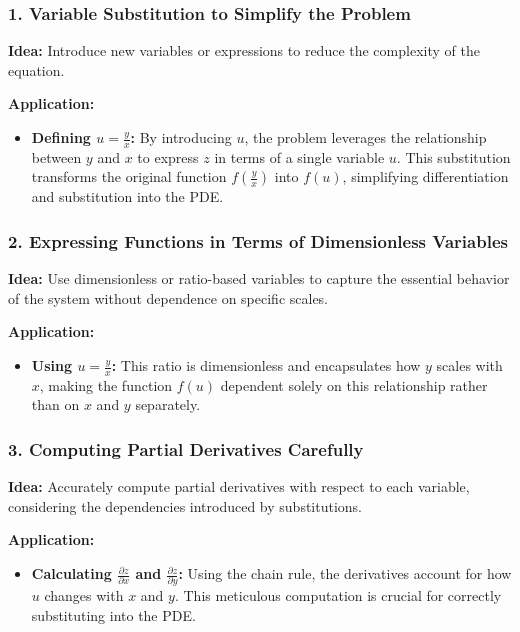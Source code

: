 \documentclass[a4paper,12pt]{book}
\begin{document}
\subsubsection{1. Variable Substitution to Simplify the Problem}

\textbf{Idea:} Introduce new variables or expressions to reduce the complexity of the equation.

\textbf{Application:}
\begin{itemize}
\item 
\textbf{Defining \( u = \frac{y}{x} \):} By introducing \( u \), the problem leverages the relationship between \( y \) and \( x \) to express \( z \) in terms of a single variable \( u \). This substitution transforms the original function \( f\left(\frac{y}{x}\right) \) into \( f(u) \), simplifying differentiation and substitution into the PDE.

\end{itemize}

\subsubsection{2. Expressing Functions in Terms of Dimensionless Variables}

\textbf{Idea:} Use dimensionless or ratio-based variables to capture the essential behavior of the system without dependence on specific scales.

\textbf{Application:}
\begin{itemize}
\item 
\textbf{Using \( u = \frac{y}{x} \):} This ratio is dimensionless and encapsulates how \( y \) scales with \( x \), making the function \( f(u) \) dependent solely on this relationship rather than on \( x \) and \( y \) separately.

\end{itemize}

\subsubsection{3. Computing Partial Derivatives Carefully}

\textbf{Idea:} Accurately compute partial derivatives with respect to each variable, considering the dependencies introduced by substitutions.

\textbf{Application:}
\begin{itemize}
\item 
\textbf{Calculating \( \frac{\partial z}{\partial x} \) and \( \frac{\partial z}{\partial y} \):} Using the chain rule, the derivatives account for how \( u \) changes with \( x \) and \( y \). This meticulous computation is crucial for correctly substituting into the PDE.

\end{itemize}
\end{document}
